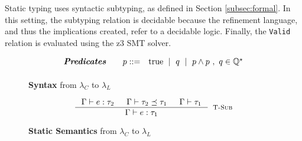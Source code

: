 Static typing uses syntactic subtyping, as defined in Section \ref{subsec:formal}. 
In this setting,  
the subtyping relation is decidable
because the refinement language, 
and thus the implications created, refer to a decidable logic.
Finally, the \texttt{Valid} relation is evaluated using 
the z3\cite{z3} SMT solver.
\begin{figure}[ht!]
\centering
$$
\begin{array}{rrcl}
\textbf{\emph{Predicates}} \quad
  & p ::=
  & 	\text{true}
  \ \mid \  q
  \ \mid \  p \land p \ , \ q \in \mathbb{Q}^\star
  \\[0.05in] 
\end{array}
$$
\caption{\textbf{Syntax} from $\lambda_C$ to $\lambda_L$}
\label{fig:liqsyntax}
\end{figure}
\begin{figure}[ht!]
\medskip {}
$$\begin{array}{cc}
\inference
  {  \hastype{\Gamma}{e}{\tau_2} && \isSubType{\Gamma}{\tau_2}{\tau_1} 
  && \isWellFormed{\Gamma}{\tau_1}
  }
  {\hastype{\Gamma}{e}{\tau_1}}
  [\tsub]
\end{array}$$
\caption{\textbf{Static Semantics} from $\lambda_C$ to $\lambda_L$}
\label{fig:rules}
\end{figure}